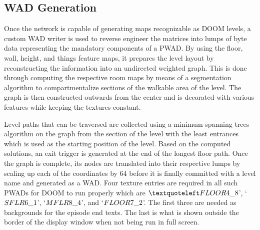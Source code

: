 \documentclass{Configuration_Files/PoliMi3i_thesis}
\begin{document}
\subsection{WAD Generation}
Once the network is capable of generating maps recognizable as DOOM levels, a 
custom WAD writer is used to reverse engineer the matrices into lumps of byte data 
representing the mandatory components of a PWAD. By using the floor, wall, height, 
and things feature maps, it prepares the level layout by reconstructing the 
information into an undirected weighted graph. This is done through computing the 
respective room maps by means of a segmentation algorithm to compartmentalize 
sections of the walkable area of the level. The graph is then constructed outwards 
from the center and is decorated with various features while keeping the textures 
constant. 

Level paths that can be traversed are collected using a minimum spanning trees 
algorithm on the graph from the section of the level with the least entrances which is 
used as the starting position of the level. Based on the computed solutions, an exit 
trigger is generated at the end of the longest floor path. Once the graph is complete, 
its nodes are translated into their respective lumps by scaling up each of the 
coordinates by 64 before it is finally committed with a level name and generated as a 
WAD. Four texture entries are required in all such PWADs for DOOM to run 
properly which are $‘FLOOR4\char`_8$’, ‘$SFLR6\char`_1$’, ‘$MFLR8\char`_4$’, and ‘$FLOOR7\char`_2$’. The first 
three are needed as backgrounds for the episode end texts. The last is what is shown 
outside the border of the display window when not being run in full screen.
\end{document}
